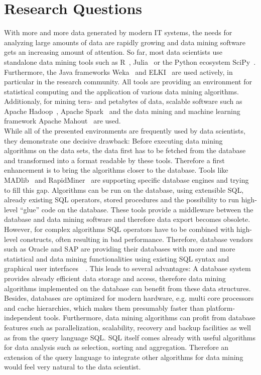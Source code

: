 \section{Research Questions}
With more and more data generated by modern IT systems, the needs for analyzing large amounts of data are rapidly growing and data mining software gets an increasing amount of attention. So far, most data scientists use standalone data mining tools such as R~\parencite{R/stats}, Julia~\parencite{DBLP:journals/corr/abs-1209-5145} or the Python ecosystem SciPy~\parencite{scipy}. Furthermore, the Java frameworks Weka~\parencite{Hall:2009:WDM:1656274.1656278} and ELKI~\parencite{DBLP:conf/ssdbm/AchtertKZ08} are used actively, in particular in the research community. All tools are providing an environment for statistical computing and the application of various data mining algorithms. Additionaly, for mining tera- and petabytes of data, scalable software such as Apache Hadoop~\parencite{hadoop}, Apache Spark~\parencite{spark} and the data mining and machine learning framework Apache Mahout~\parencite{mahout} are used.
\\
While all of the presented environments are frequently used by data scientists, they demonstrate one decisive drawback: Before executing data mining algorithms on the data sets, the data first has to be fetched from the database and transformed into a format readable by these tools. Therefore a first enhancement is to bring the algorithms closer to the database. Tools like MADlib~\parencite{MADlib} and RapidMiner~\parencite{rapidminer} are supporting specific database engines and trying to fill this gap. Algorithms can be run on the database, using extensible SQL, already existing SQL operators, stored procedures and the possibility to run high-level \enquote{glue} code on the database. These tools provide a middleware between the database and data mining software and therefore data export becomes obsolete. 
\\
However, for complex algorithms SQL operators have to be combined with high-level constructs, often resulting in bad performance. Therefore, database vendors such as Oracle and SAP are providing their databases with more and more statistical and data mining functionalities using existing SQL syntax and graphical user interfaces~\parencite{oracle}~\parencite{pal}. This leads to several advantages: A database system provides already efficient data storage and access, therefore data mining algorithms implemented on the database can benefit from these data structures. Besides, databases are optimized for modern hardware, e.g. multi core processors and cache hierarchies, which makes them presumably faster than platform-independent tools. Furthermore, data mining algorithms can profit from database features such as parallelization, scalability, recovery and backup facilities as well as from the query language SQL. SQL itself comes already with useful algorithms for data analysis such as selection, sorting and aggregation. Therefore an extension of the query language to integrate other algorithms for data mining would feel very natural to the data scientist. 
